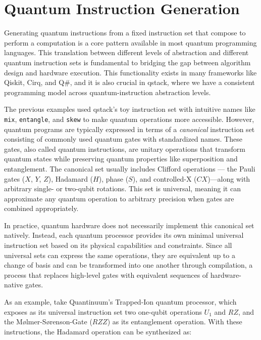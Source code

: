\section{Quantum Instruction Generation}\label{sec:synthesis}

Generating quantum instructions from a fixed instruction set that compose to perform a computation is a core pattern available in most quantum programming languages. This translation between different levels of abstraction and different quantum instruction sets is fundamental to bridging the gap between algorithm design and hardware execution. This functionality exists in many frameworks like Qiskit, Cirq, and Q\#, and it is also crucial in qstack, where we have a consistent programming model across quantum-instruction abstraction levels.

The previous examples used qstack's toy instruction set with intuitive names like \texttt{mix}, \texttt{entangle}, and \texttt{skew} to make quantum operations more accessible. However, quantum programs are typically expressed in terms of a \textit{canonical} instruction set consisting of commonly used quantum gates with standardized names. These gates, also called quantum instructions, are unitary operations that transform quantum states while preserving quantum properties like superposition and entanglement. The canonical set usually includes Clifford operations --- the Pauli gates ($X$, $Y$, $Z$), Hadamard ($H$), phase ($S$), and controlled-X ($CX$)—along with arbitrary single- or two-qubit rotations. This set is universal, meaning it can approximate any quantum operation to arbitrary precision when gates are combined appropriately.

In practice, quantum hardware does not necessarily implement this canonical set natively. Instead, each quantum processor provides its own minimal universal instruction set based on its physical capabilities and constraints. Since all universal sets can express the same operations, they are equivalent up to a change of basis and can be transformed into one another through compilation, a process that replaces high-level gates with equivalent sequences of hardware-native gates.

As an example, take Quantinuum's Trapped-Ion quantum processor\cite{moses2023race}, which exposes as its universal instruction set two one-qubit operations $U_1$ and $RZ$, and the Mølmer-Sørenson-Gate ($RZZ$) as its entanglement operation. With these instructions, the Hadamard operation can be synthesized as:

